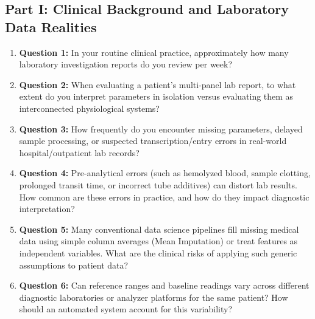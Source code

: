 \documentclass[MTech]{ugthesis}
\begin{document}
\begin{appendices}
\section*{Part I: Clinical Background and Laboratory Data Realities}
\begin{enumerate}
    \item \textbf{Question 1:} In your routine clinical practice, approximately how many laboratory investigation reports do you review per week?
    \item \textbf{Question 2:} When evaluating a patient's multi-panel lab report, to what extent do you interpret parameters in isolation versus evaluating them as interconnected physiological systems?
    \item \textbf{Question 3:} How frequently do you encounter missing parameters, delayed sample processing, or suspected transcription/entry errors in real-world hospital/outpatient lab records?
    \item \textbf{Question 4:} Pre-analytical errors (such as hemolyzed blood, sample clotting, prolonged transit time, or incorrect tube additives) can distort lab results. How common are these errors in practice, and how do they impact diagnostic interpretation?
    \item \textbf{Question 5:} Many conventional data science pipelines fill missing medical data using simple column averages (Mean Imputation) or treat features as independent variables. What are the clinical risks of applying such generic assumptions to patient data?
    \item \textbf{Question 6:} Can reference ranges and baseline readings vary across different diagnostic laboratories or analyzer platforms for the same patient? How should an automated system account for this variability?
\end{enumerate}


\end{appendices}
\end{document}
